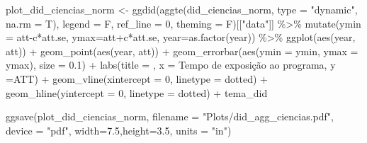 \documentclass[
  letterpaper,
  DIV=11,
  numbers=noendperiod]{scrartcl}
\newenvironment{Shaded}{\begin{snugshade}}{\end{snugshade}}
\newcommand{\AttributeTok}[1]{\textcolor[rgb]{0.40,0.45,0.13}{#1}}
\newcommand{\DecValTok}[1]{\textcolor[rgb]{0.68,0.00,0.00}{#1}}
\newcommand{\FloatTok}[1]{\textcolor[rgb]{0.68,0.00,0.00}{#1}}
\newcommand{\FunctionTok}[1]{\textcolor[rgb]{0.28,0.35,0.67}{#1}}
\newcommand{\NormalTok}[1]{\textcolor[rgb]{0.00,0.23,0.31}{#1}}
\newcommand{\OtherTok}[1]{\textcolor[rgb]{0.00,0.23,0.31}{#1}}
\newcommand{\SpecialCharTok}[1]{\textcolor[rgb]{0.37,0.37,0.37}{#1}}
\newcommand{\StringTok}[1]{\textcolor[rgb]{0.13,0.47,0.30}{#1}}
\begin{document}
\begin{Shaded}
\begin{Highlighting}[]
\NormalTok{plot\_did\_ciencias\_norm }\OtherTok{\textless{}{-}}
\FunctionTok{ggdid}\NormalTok{(}\FunctionTok{aggte}\NormalTok{(did\_ciencias\_norm, }\AttributeTok{type =} \StringTok{"dynamic"}\NormalTok{, }\AttributeTok{na.rm =}\NormalTok{ T),       }
      \AttributeTok{legend =}\NormalTok{ F, }\AttributeTok{ref\_line =} \DecValTok{0}\NormalTok{, }\AttributeTok{theming =}\NormalTok{ F)[[}\StringTok{"data"}\NormalTok{]] }\SpecialCharTok{\%\textgreater{}\%} 
    \FunctionTok{mutate}\NormalTok{(}\AttributeTok{ymin =}\NormalTok{ att}\SpecialCharTok{{-}}\NormalTok{c}\SpecialCharTok{*}\NormalTok{att.se, }\AttributeTok{ymax=}\NormalTok{att}\SpecialCharTok{+}\NormalTok{c}\SpecialCharTok{*}\NormalTok{att.se, }\AttributeTok{year=}\FunctionTok{as.factor}\NormalTok{(year)) }\SpecialCharTok{\%\textgreater{}\%} 
    \FunctionTok{ggplot}\NormalTok{(}\FunctionTok{aes}\NormalTok{(year, att)) }\SpecialCharTok{+}
    \FunctionTok{geom\_point}\NormalTok{(}\FunctionTok{aes}\NormalTok{(year, att)) }\SpecialCharTok{+}
    \FunctionTok{geom\_errorbar}\NormalTok{(}\FunctionTok{aes}\NormalTok{(}\AttributeTok{ymin =}\NormalTok{ ymin, }\AttributeTok{ymax =}\NormalTok{ ymax), }\AttributeTok{size =} \FloatTok{0.1}\NormalTok{) }\SpecialCharTok{+}
    \FunctionTok{labs}\NormalTok{(}\AttributeTok{title =} \StringTok{\textquotesingle{}\textquotesingle{}}\NormalTok{,}
         \AttributeTok{x =} \StringTok{\textquotesingle{}Tempo de exposição ao programa\textquotesingle{}}\NormalTok{,}
         \AttributeTok{y =}\StringTok{\textquotesingle{}ATT\textquotesingle{}}\NormalTok{) }\SpecialCharTok{+}
    \FunctionTok{geom\_vline}\NormalTok{(}\AttributeTok{xintercept =} \StringTok{\textquotesingle{}0\textquotesingle{}}\NormalTok{, }\AttributeTok{linetype =} \StringTok{\textquotesingle{}dotted\textquotesingle{}}\NormalTok{) }\SpecialCharTok{+}
    \FunctionTok{geom\_hline}\NormalTok{(}\AttributeTok{yintercept =} \DecValTok{0}\NormalTok{, }\AttributeTok{linetype =} \StringTok{\textquotesingle{}dotted\textquotesingle{}}\NormalTok{) }\SpecialCharTok{+}
\NormalTok{    tema\_did}

\FunctionTok{ggsave}\NormalTok{(plot\_did\_ciencias\_norm, }
       \AttributeTok{filename =} \StringTok{"Plots/did\_agg\_ciencias.pdf"}\NormalTok{,}
       \AttributeTok{device =} \StringTok{"pdf"}\NormalTok{,}
       \AttributeTok{width=}\FloatTok{7.5}\NormalTok{,}\AttributeTok{height=}\FloatTok{3.5}\NormalTok{, }\AttributeTok{units =} \StringTok{"in"}\NormalTok{)}


\end{Highlighting}
\end{Shaded}
\end{document}
